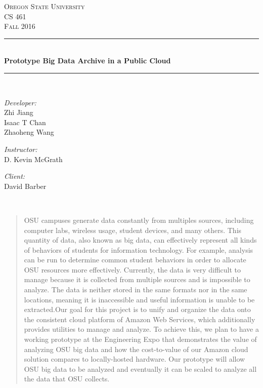 \documentclass[letterpaper,10pt]{article}
\begin{document}
    \begin{titlepage}
    \newcommand{\HRule}{\rule{\linewidth}{0.5mm}}
    \center 
    \textsc{\Large Oregon State University}\\[1.5cm] 
    \textsc{\Large CS 461}\\[0.5cm] 
    \textsc{\Large Fall 2016}\\[0.5cm] 
    \HRule \\[0.4cm]
    { \huge \bfseries Prototype Big Data Archive in a Public Cloud}\\[0.4cm] %
    \HRule \\[1.5cm]
    \begin{minipage}{0.4\textwidth}
        \begin{flushleft} \large
        \emph{Developer:}\\
        Zhi Jiang\\
        Isaac T Chan\\
        Zhaoheng Wang
        \end{flushleft}
    \end{minipage}
    \begin{minipage}{0.4\textwidth}
        \begin{flushright} \large
        \emph{Instructor:} \\
        D. Kevin McGrath
        \end{flushright}
        \begin{flushright} \large
        \emph{Client:} \\
        David Barber
        \end{flushright}
    \end{minipage}\\[2cm]
    \begin{abstract}
    OSU campuses generate data constantly from multiples sources, including computer labs, wireless usage, student devices, and many others. This quantity of data, also known as big data, can effectively represent all kinds of behaviors of students for information technology. For example, analysis can be run to determine common student behaviors in order to allocate OSU resources more effectively. Currently, the data is very difficult to manage because it is collected from multiple sources and is impossible to analyze. The data is neither stored in the same formats nor in the same locations, meaning it is inaccessible and useful information is unable to be extracted.Our goal for this project is to unify and organize the data onto the consistent cloud platform of Amazon Web Services, which additionally provides utilities to manage and analyze. To achieve this, we plan to have a working prototype at the Engineering Expo that demonstrates the value of analyzing OSU big data and how the cost-to-value of our Amazon cloud solution compares to locally-hosted hardware. Our prototype will allow OSU big data to be analyzed and eventually it can be scaled to analyze all the data that OSU collects.
    \end{abstract}
    \vfill %
    \end{titlepage}
	
\end{document}
